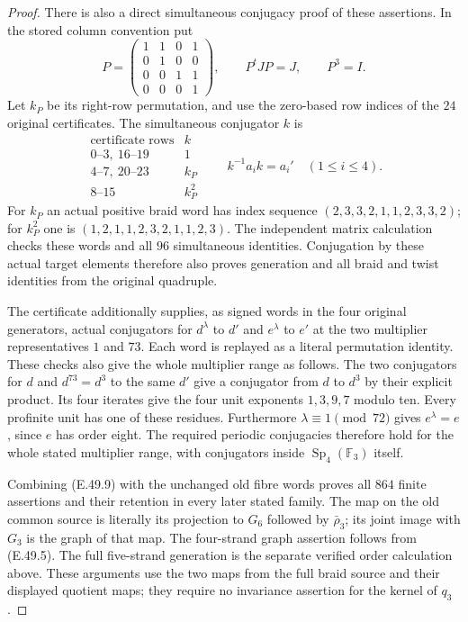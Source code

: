 \begin{proof}
There is also a direct simultaneous conjugacy proof of these
assertions.  In the stored column convention put
\[
 P=\begin{pmatrix}
 1&1&0&1\\0&1&0&0\\0&0&1&1\\0&0&0&1
 \end{pmatrix},\qquad P^tJP=J,\qquad P^3=I.
 \tag{E.49.12}
\]
Let $k_P$ be its right-row permutation, and use the zero-based
row indices of the $24$ original certificates.  The simultaneous
conjugator $k$ is
\[
\begin{array}{c|c}
\text{certificate rows}&k\\\hline
0\text{--}3,\ 16\text{--}19&1\\
4\text{--}7,\ 20\text{--}23&k_P\\
8\text{--}15&k_P^2
\end{array}
\qquad k^{-1}a_i k=a_i'\quad(1\leq i\leq4).
 \tag{E.49.13}
\]
For $k_P$ an actual positive braid word has index sequence
$(2,3,3,2,1,1,2,3,3,2)$; for $k_P^2$ one is
$(1,2,1,1,2,3,2,1,1,2,3)$.  The independent matrix
calculation checks these words and all $96$ simultaneous
identities.  Conjugation by these actual target elements
therefore also proves generation and all braid and twist
identities from the original quadruple.

The certificate additionally supplies, as signed words in
the four original generators, actual conjugators for
$d^\lambda$ to $d'$ and $e^\lambda$ to $e'$ at the two
multiplier representatives $1$ and $73$.  Each word is replayed
as a literal permutation identity.  These checks also give
the whole multiplier range as follows.  The two conjugators
for $d$ and $d^{73}=d^3$ to the same $d'$ give a conjugator
from $d$ to $d^3$ by their explicit product.  Its four iterates
give the four unit exponents $1,3,9,7$ modulo ten.  Every
profinite unit has one of these residues.  Furthermore
$\lambda\equiv1\pmod{72}$ gives $e^\lambda=e$, since $e$
has order eight.  The required periodic conjugacies therefore
hold for the whole stated multiplier range, with conjugators
inside $\operatorname{Sp}_4(\mathbb F_3)$ itself.

Combining \textup{(E.49.9)} with the unchanged old fibre words
proves all $864$ finite assertions and their retention in every
later stated family.  The map on the old common source is
literally its projection to $G_6$ followed by $\bar\rho_3$;
its joint image with $G_3$ is the graph of that map.  The
four-strand graph assertion follows from \textup{(E.49.5)}.
The full five-strand generation is the separate verified
order calculation above.  These arguments use the two maps
from the full braid source and their displayed quotient maps;
they require no invariance assertion for the kernel of $q_3$.


\end{proof}
